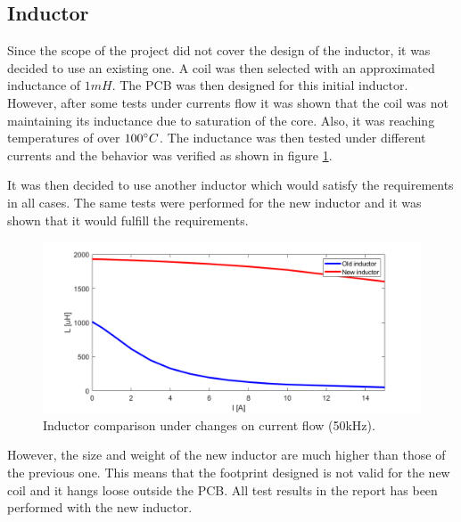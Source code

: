 \subsection{Inductor}
\label{Coil problems}
Since the scope of the project did not cover the design of the inductor, it was decided to use an existing one. A coil was then selected with an approximated inductance of $1mH$.
The PCB was then designed for this initial inductor. However, after some  tests under currents flow it was shown that the coil was not maintaining its inductance due to saturation of the core. Also, it was reaching temperatures of over $100\dec C$. The inductance was then tested under different currents and the behavior was verified as shown in figure \ref{Coil comparison}.

It was then decided to use another inductor which would satisfy the requirements in all cases. The same tests were performed for the new inductor and it was shown that it would fulfill the requirements. 

\begin{figure}[H]
	\begin{center}
		\includegraphics[width=1\textwidth]{docs/discussion/CoilTests/CoilComparison50kHzV2.png}
		\caption{Inductor comparison under changes on current flow (50kHz).}
		\label{Coil comparison}
	\end{center}	
\end{figure}

However, the size and weight of the new inductor are much higher than those of the previous one. This means that the footprint designed is not valid for the new coil and it hangs loose outside the PCB. All test results in the report has been performed with the new inductor. 

